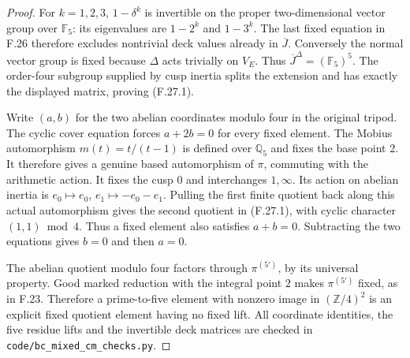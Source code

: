 \begin{proof}
For $k=1,2,3$, $1-\delta^k$ is invertible on the
proper two-dimensional vector group over $\mathbb F_5$:
its eigenvalues are $1-2^k$ and $1-3^k$.
The last fixed equation in F.26 therefore excludes
nontrivial deck values already in $\overline J$.
Conversely the normal vector group is fixed because
$\Delta$ acts trivially on $V_E$.
Thus $\overline J^\Delta=(\mathbb F_5)^5$.
The order-four subgroup supplied by cusp inertia
splits the extension and has exactly the displayed
matrix, proving (F.27.1).

Write $(a,b)$ for the two abelian coordinates modulo
four in the original tripod. The cyclic cover equation
forces $a+2b=0$ for every fixed element.
The Mobius automorphism $m(t)=t/(t-1)$ is defined
over $\mathbb Q_5$ and fixes the base point $2$.
It therefore gives a genuine based automorphism of
$\pi$, commuting with the arithmetic action.
It fixes the cusp $0$ and interchanges $1,\infty$.
Its action on abelian inertia is
$e_0\mapsto e_0$, $e_1\mapsto-e_0-e_1$.
Pulling the first finite quotient back along this
actual automorphism gives the second quotient in
(F.27.1), with cyclic character $(1,1)\bmod4$.
Thus a fixed element also satisfies $a+b=0$.
Subtracting the two equations gives $b=0$ and then
$a=0$.

The abelian quotient modulo four factors through
$\pi^{(5')}$, by its universal property. Good marked
reduction with the integral point $2$ makes
$\pi^{(5')}$ fixed, as in F.23.
Therefore a prime-to-five element with nonzero image
in $(\mathbb Z/4)^2$ is an explicit fixed quotient
element having no fixed lift. All coordinate identities,
the five residue lifts and the invertible deck matrices
are checked in \texttt{code/bc\_mixed\_cm\_checks.py}.
\end{proof}

